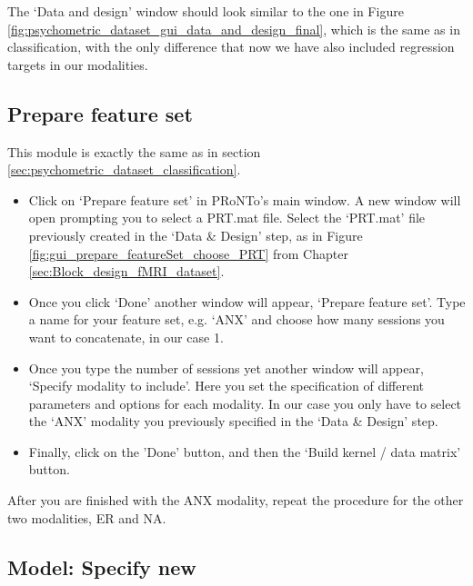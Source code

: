 The `Data and design' window should look similar to the one in Figure \ref{fig:psychometric_dataset_gui_data_and_design_final}, which is the same as in classification, with the only difference that now we have also included regression targets in our modalities.


\subsection{Prepare feature set}

This module is exactly the same as in section \ref{sec:psychometric_dataset_classification}.

\begin{itemize}
	
	\item Click on `Prepare feature set' in PRoNTo's main window. A new window will open prompting you to select a PRT.mat file. Select the `PRT.mat' file previously created in the `Data \& Design' step, as in Figure \ref{fig:gui_prepare_featureSet_choose_PRT} from Chapter \ref{sec:Block_design_fMRI_dataset}.
	
	\item Once you click `Done' another window will appear, `Prepare feature set'. Type a name for your feature set, e.g. `ANX' and choose how many sessions you want to concatenate, in our case 1.
	
	\item Once you type the number of sessions yet another window will appear, `Specify modality to include'. Here you set the specification of different parameters and options for each modality. In our case you only have to select the `ANX' modality you previously specified in the `Data \& Design' step.
	
	\item Finally, click on the 'Done' button, and then the `Build kernel / data matrix' button.

\end{itemize}

After you are finished with the ANX modality, repeat the procedure for the other two modalities, ER and NA.


\subsection{Model: Specify new}

